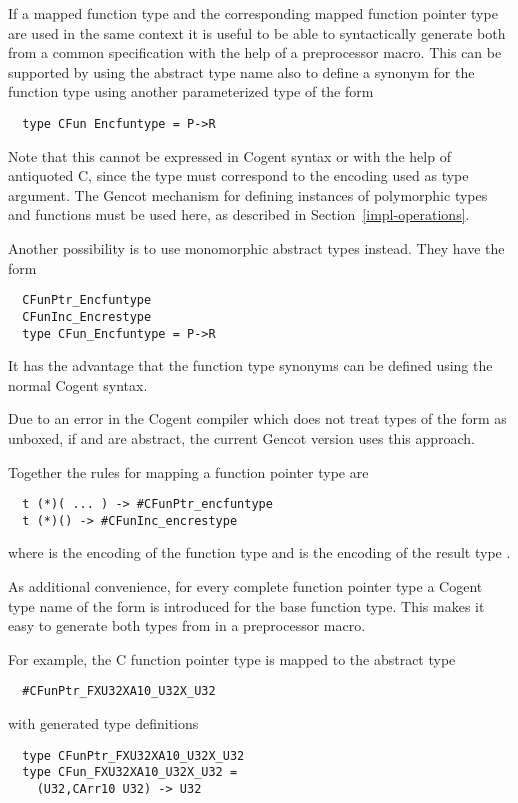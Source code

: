 If a mapped function type and the corresponding mapped function pointer type are used in the same context it is useful to 
be able to syntactically generate both from a common specification with the help of a preprocessor macro. This can be
supported by using the abstract type name also to define a synonym for the function type using another parameterized
type of the form
\begin{verbatim}
  type CFun Encfuntype = P->R
\end{verbatim}
Note that this cannot be expressed in Cogent syntax or with the help of antiquoted C, since the type  must
correspond to the encoding used as type argument. The Gencot mechanism for defining instances of polymorphic types and
functions must be used here, as described in Section~\ref{impl-operations}.

Another possibility is to use monomorphic abstract types instead. They have the form
\begin{verbatim}
  CFunPtr_Encfuntype
  CFunInc_Encrestype
  type CFun_Encfuntype = P->R
\end{verbatim}
It has the advantage that the function type synonyms can be defined using the normal Cogent syntax.

Due to an error in the Cogent compiler which does not treat types of the form  as unboxed, if 
and  are abstract, the current Gencot version uses this approach.

Together the rules for mapping a function pointer type are
\begin{verbatim}
  t (*)( ... ) -> #CFunPtr_encfuntype
  t (*)() -> #CFunInc_encrestype
\end{verbatim}
where  is the encoding of the function type  
and  is the encoding of the result type .

As additional convenience, for every complete function pointer type a Cogent type name of the form 
is introduced for the base function type. This makes it easy to generate both types from  in a preprocessor
macro.

For example, the C function pointer type  is mapped to the abstract type
\begin{verbatim}
  #CFunPtr_FXU32XA10_U32X_U32
\end{verbatim}
with generated type definitions
\begin{verbatim}
  type CFunPtr_FXU32XA10_U32X_U32
  type CFun_FXU32XA10_U32X_U32 =
    (U32,CArr10 U32) -> U32
\end{verbatim}


